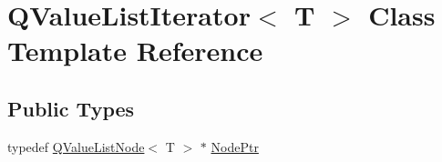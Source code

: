 \hypertarget{class_q_value_list_iterator}{}\section{Q\+Value\+List\+Iterator$<$ T $>$ Class Template Reference}
\label{class_q_value_list_iterator}
\subsection*{Public Types}
\begin{DoxyCompactItemize}
\item 
typedef \mbox{\hyperlink{class_q_value_list_node}{Q\+Value\+List\+Node}}$<$ T $>$ $\ast$ \mbox{\hyperlink{class_q_value_list_iterator_abf409d04d86ddd5977132fecb2e6db61}{Node\+Ptr}}
\end{DoxyCompactItemize}
